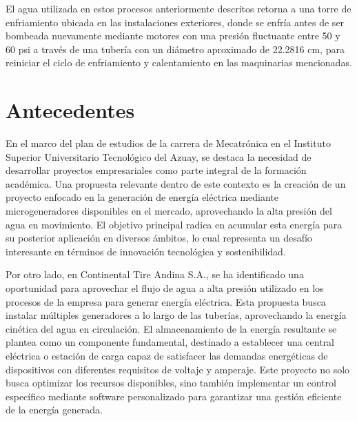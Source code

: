 \documentclass[11pt]{article}
\begin{document}
    El agua utilizada en estos procesos anteriormente descritos retorna a una torre de
    enfriamiento ubicada en las instalaciones exteriores, donde se enfría antes de ser
    bombeada nuevamente mediante motores con una presión fluctuante entre 50 y 60 psi a
    través de una tubería con un diámetro aproximado de 22.2816 cm, para reiniciar el ciclo de
    enfriamiento y calentamiento en las maquinarias mencionadas.

    \section{Antecedentes}
    En el marco del plan de estudios de la carrera de Mecatrónica en el Instituto Superior
    Universitario Tecnológico del Azuay, se destaca la necesidad de desarrollar proyectos
    empresariales como parte integral de la formación académica. Una propuesta relevante
    dentro de este contexto es la creación de un proyecto enfocado en la generación de energía
    eléctrica mediante microgeneradores disponibles en el mercado, aprovechando la alta
    presión del agua en movimiento. El objetivo principal radica en acumular esta energía para
    su posterior aplicación en diversos ámbitos, lo cual representa un desafío interesante en
    términos de innovación tecnológica y sostenibilidad.

    Por otro lado, en Continental Tire Andina S.A., se ha identificado una oportunidad para
    aprovechar el flujo de agua a alta presión utilizado en los procesos de la empresa para
    generar energía eléctrica. Esta propuesta busca instalar múltiples generadores a lo largo de
    las tuberías, aprovechando la energía cinética del agua en circulación. El almacenamiento
    de la energía resultante se plantea como un componente fundamental, destinado a
    establecer una central eléctrica o estación de carga capaz de satisfacer las demandas
    energéticas de dispositivos con diferentes requisitos de voltaje y amperaje. Este proyecto no
    solo busca optimizar los recursos disponibles, sino también implementar un control
    específico mediante software personalizado para garantizar una gestión eficiente de la
    energía generada.

\end{document}
